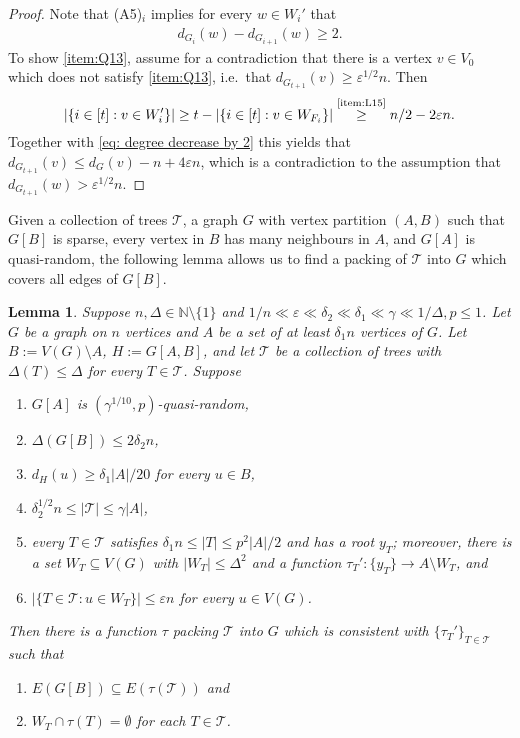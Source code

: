 \documentclass[a4paper, 11pt, reqno]{amsart}
\newtheorem{lemma}[definition]{Lemma}
\numberwithin{equation}{section}
\newcommand{\1}{{\rm 1\hspace*{-0.4ex}%
\rule{0.1ex}{1.52ex}\hspace*{0.2ex}}}
\newcommand{\N}{\mathbb N}
\newcommand{\es}{\emptyset}
\newcommand{\cT}{\mathcal{T}}
\renewcommand{\epsilon}{\varepsilon}
\newcommand{\sm}{\setminus}
\newcommand{\sub}{\subseteq}
\begin{document}
\begin{proof}
Note that (A5)$_i$ implies for every $w\in W_i'$ that
\begin{align}\label{eq: degree decrease by 2}
d_{G_{i}}(w)-d_{G_{i+1}}(w)\geq 2.
\end{align}
 To show \ref{item:Q13}, assume for a contradiction that there is a vertex $v \in V_0$ which does not satisfy \ref{item:Q13}, i.e.~that $d_{G_{t+1}}(v) \geq \epsilon^{1/2}n$. 
Then
$$|\{i\in[t]: v\in W'_i\}| \geq t - |\{i\in[t]: v\in W_{F_i}\}| \stackrel{\text{\ref{item:L15}}}{\geq} n/2 -2\epsilon n.$$ 
Together with \eqref{eq: degree decrease by 2} this yields that $d_{G_{t+1}}(v) \leq d_{G}(v) - n + 4\epsilon n$, 
which is a contradiction to the assumption that $d_{G_{t+1}}(w) > \epsilon^{1/2}n$.
\end{proof}
Given a collection of trees $\cT$, 
a graph $G$ with vertex partition $(A,B)$ such that $G[B]$ is sparse,
every vertex in $B$ has many neighbours in $A$,
and $G[A]$ is quasi-random,
the following lemma allows us to find a packing of $\cT$ into $G$ which covers all edges of $G[B]$.

\begin{lemma}\label{lem: clear delta2}
Suppose $n,\Delta\in \N\sm\{1\}$ and $1/n\ll\epsilon \ll\delta_2 \ll\delta_1 \ll  \gamma \ll 1/\Delta,p \leq 1$.
Let $G$ be a graph on $n$ vertices and $A$ be a set of at least $\delta_1 n$ vertices of $G$.
Let $B:=V(G)\sm A$, $H:=G[A,B]$, and 
let $\cT$ be a collection of trees with $\Delta(T)\leq \Delta$ for every $T\in \cT$. 
Suppose 
\begin{enumerate}[label=(c2.\arabic*)]
	\item\label{item:L21} $G[A]$ is $(\gamma^{1/10},p)$-quasi-random, 
	\item\label{item:L22} $\Delta(G[B])\leq 2\delta_2 n$,
	\item\label{item:L23} $d_H(u)\geq \delta_1 |A|/20$ for every $u\in B$,
	\item\label{item:L24} $\delta_2^{1/2} n \leq |\cT| \leq \gamma |A|$, 
	\item\label{item:L25} every $T\in \cT$ satisfies $\delta_1 n\leq |T|\leq p^2|A|/2$ and has a root $y_T$;
	moreover, there is a set $W_T\sub V(G)$ with $|W_T|\leq \Delta^2$ and
	 a function $\tau_T':\{y_T\}\to A \sm W_T$, and
  \item\label{item:L26} $|\{T\in \cT: u\in W_{T}\}|\leq \epsilon n$ for every $u\in V(G)$.
\end{enumerate}
Then there is a function $\tau$ packing $\cT$ into $G$ which is consistent with $\{\tau_T'\}_{T\in \cT}$ such that 
\begin{enumerate}[label=(C2.\arabic*)]
	\item\label{item:Q21} $E(G[B])\subseteq E(\tau(\cT))$ and
	\item\label{item:Q22} $W_{T}\cap  \tau(T)=\es$ for each $T\in \cT$.
\end{enumerate}
\end{lemma}
\end{document}
